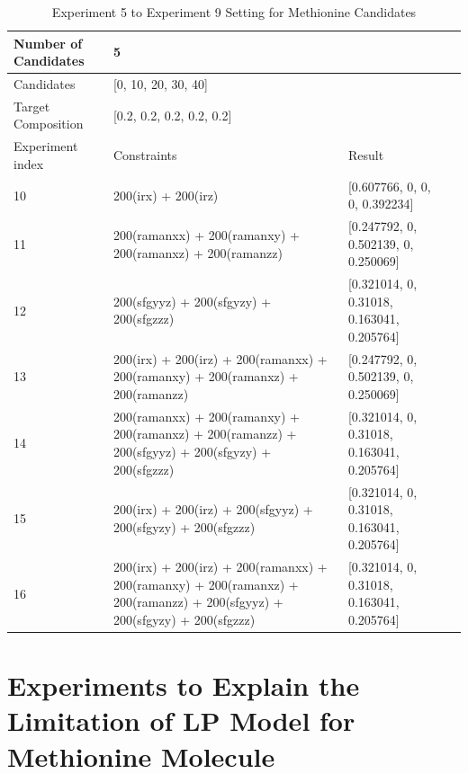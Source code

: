 \begin{table}\tiny
\begin{center}
\begin{tabular}{| l | p{3cm} | l | l |}
\hline
Number of Candidates & \multicolumn{2}{l|}{5} \\ \hline
Candidates & \multicolumn{2}{l|}{[0, 10, 20, 30, 40]} \\ \hline
Target Composition & \multicolumn{2}{l|}{[0.2, 0.2, 0.2, 0.2, 0.2]} \\ \hline
Experiment index & Constraints & Result  \\ \hline
10 & 200(irx) + 200(irz)  & [0.607766, 0, 0, 0, 0.392234]  \\ \hline
11 & 200(ramanxx) + 200(ramanxy) + 200(ramanxz) + 200(ramanzz)  & [0.247792, 0, 0.502139, 0, 0.250069]  \\ \hline
12 & 200(sfgyyz) + 200(sfgyzy) + 200(sfgzzz) & [0.321014, 0, 0.31018, 0.163041, 0.205764]  \\ \hline
13 & 200(irx) + 200(irz) + 200(ramanxx) + 200(ramanxy) + 200(ramanxz) + 200(ramanzz) & [0.247792, 0, 0.502139, 0, 0.250069]  \\ \hline
14 & 200(ramanxx) + 200(ramanxy) + 200(ramanxz) + 200(ramanzz) + 200(sfgyyz) + 200(sfgyzy) + 200(sfgzzz) & [0.321014, 0, 0.31018, 0.163041, 0.205764]  \\ \hline
15 & 200(irx) + 200(irz) + 200(sfgyyz) + 200(sfgyzy) + 200(sfgzzz) & [0.321014, 0, 0.31018, 0.163041, 0.205764]  \\ \hline
16 & 200(irx) + 200(irz) + 200(ramanxx) + 200(ramanxy) + 200(ramanxz) + 200(ramanzz) + 200(sfgyyz) + 200(sfgyzy) + 200(sfgzzz) & [0.321014, 0, 0.31018, 0.163041, 0.205764]  \\ \hline
\end{tabular} 
\end{center}
\caption{Experiment 5 to Experiment 9 Setting for Methionine Candidates} \label{tab:4.3}
\end{table}

\section{Experiments to Explain the Limitation of LP Model for Methionine Molecule}

